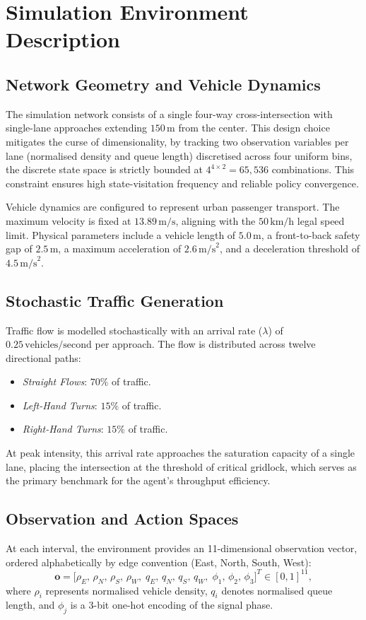 \documentclass[12pt]{article}
\begin{document}
\section{Simulation Environment Description}

\subsection{Network Geometry and Vehicle Dynamics}
The simulation network consists of a single four-way cross-intersection with single-lane approaches extending \( 150\,\text{m} \) from the center. This design choice mitigates the curse of dimensionality, by tracking two observation variables per lane (normalised density and queue length) discretised across four uniform bins, the discrete state space is strictly bounded at \( 4^{4 \times 2} = 65{,}536 \) combinations. This constraint ensures high state-visitation frequency and reliable policy convergence.

Vehicle dynamics are configured to represent urban passenger transport. The maximum velocity is fixed at \( 13.89\,\text{m/s} \), aligning with the \( 50\,\text{km/h} \) legal speed limit. Physical parameters include a vehicle length of \( 5.0\,\text{m} \), a front-to-back safety gap of \( 2.5\,\text{m} \), a maximum acceleration of \( 2.6\,\text{m/s}^2 \), and a deceleration threshold of \( 4.5\,\text{m/s}^2 \).

\subsection{Stochastic Traffic Generation}
Traffic flow is modelled stochastically with an arrival rate (\( \lambda \)) of \( 0.25\,\text{vehicles/second} \) per approach. The flow is distributed across twelve directional paths:
\begin{itemize}
	\item \emph{Straight Flows}: \( 70\% \) of traffic.
	\item \emph{Left-Hand Turns}: \( 15\% \) of traffic.
	\item \emph{Right-Hand Turns}: \( 15\% \) of traffic.
\end{itemize}
At peak intensity, this arrival rate approaches the saturation capacity of a single lane, placing the intersection at the threshold of critical gridlock, which serves as the primary benchmark for the agent's throughput efficiency.

\subsection{Observation and Action Spaces}
At each interval, the environment provides an 11-dimensional observation vector, ordered alphabetically by edge convention (East, North, South, West):
\begin{equation}
	\mathbf{o} = \bigl[
	\rho_E,\, \rho_N,\, \rho_S,\, \rho_W,\;
	q_E,\, q_N,\, q_S,\, q_W,\;
	\phi_1,\, \phi_2,\, \phi_3
	\bigr]^T \in [0,1]^{11},
\end{equation}
where \( \rho_i \) represents normalised vehicle density, \( q_i \) denotes normalised queue length, and \( \phi_j \) is a 3-bit one-hot encoding of the signal phase.
\end{document}
